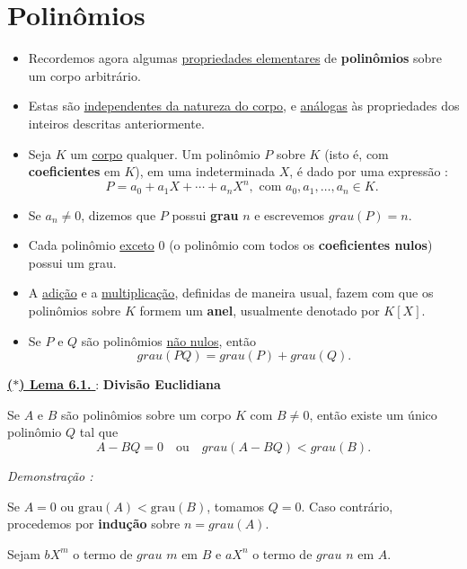 \section*{Polinômios}

    \begin{itemize}[left=0.5cm, align=left, nosep]
        \item Recordemos agora algumas \underline{propriedades elementares} de \textbf{polinômios} sobre um corpo arbitrário.  
        \item Estas são \underline{independentes da natureza do corpo}, e \underline{análogas} às propriedades dos inteiros descritas anteriormente.  
        \item Seja $K$ um \underline{corpo} qualquer. Um polinômio $P$ sobre $K$ (isto é, com \textbf{coeficientes} em $K$), em uma indeterminada $X$, é dado por uma expressão : 
        \[
            P = a_0 + a_1 X + \cdots + a_n X^n, \text{ com $a_0, a_1, \ldots, a_n \in K$. }
        \]
        \item Se $a_n \neq 0$, dizemos que $P$ possui \textbf{grau} $n$ e escrevemos $grau(P) = n$.  
        \item Cada polinômio \underline{exceto} $0$ (o polinômio com todos os \textbf{coeficientes nulos}) possui um grau.  
        \item A \underline{adição} e a \underline{multiplicação}, definidas de maneira usual, fazem com que os polinômios sobre $K$ formem um \textbf{anel}, usualmente denotado por $K[X]$.  
        \item Se $P$ e $Q$ são polinômios \underline{não nulos}, então
        \[
            \boxed{grau(PQ) = grau(P) + grau(Q)}.
        \]
    
    \end{itemize}

    \underline{\underline{ \textbf{\textcolor{cinzaEscuro}{($\ast$) Lema 6.1.}} }} : \textbf{\textcolor{cinzaEscuro}{Divisão Euclidiana}}

        Se $A$ e $B$ são polinômios sobre um corpo $K$ com $B \neq 0$, então existe um único polinômio $Q$ tal que 
        \[
        \boxed{A - BQ = 0} \quad \text{ou} \quad \boxed{grau(A - BQ) < grau(B)}.
        \]

        \noindent\textit{Demonstração : }

        Se $A = 0$ ou $\text{grau}(A) < \text{grau}(B)$, tomamos $Q = 0$.  
        Caso contrário, procedemos por \textbf{indução} sobre $n = grau(A)$.  

        Sejam $bX^m$ o termo de $grau$ $m$ em $B$ e $aX^n$ o termo de $grau$ $n$ em $A$.  

